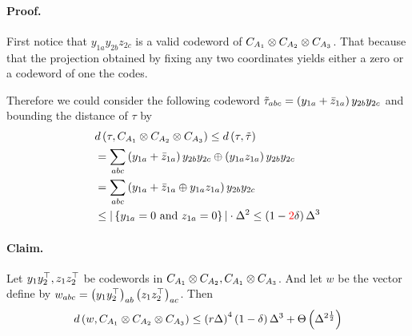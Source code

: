 \documentclass{article}
\begin{document}
\begin{multicols*}{2}
      \paragraph{Proof.} First notice that $y_{1a}y_{2b}z_{2c} $ is a valid codeword of $C_{A_{1}} \otimes C_{A_{2}} \otimes C_{A_{3}}$. That because that the projection obtained by 
      fixing any two coordinates yields either a zero or a codeword of one the codes.
      
      Therefore we could consider the following codeword $ \tilde{\tau}_{abc} = \left( y_{1a} + \bar{z}_{1a} \right)y_{2b}y_{2c} $ and bounding the distance of $\tau$ by 
      \begin{equation*}
	\begin{split}
      & d \left( \tau, C_{A_{1}} \otimes C_{A_{2}} \otimes C_{A_{3}} \right)  \le d \left( \tau, \tilde{\tau} \right) \\ 
      & = \sum_{abc}{   \left( y_{1a} + \bar{z}_{1a} \right)y_{2b}y_{2c} \oplus  \left( y_{1a}z_{1a} \right)y_{2b}y_{2c}  } \\
      & =  \sum_{abc}{   \left( y_{1a} + \bar{z}_{1a} \oplus y_{1a}z_{1a}  \right)y_{2b}y_{2c}  } \\
      & \le | \left\{ y_{1a} = 0 \text{ and }  z_{1a} = 0   \right\} | \cdot \Delta^{2} \le \left( 1-\color{red}2\color{black}\delta \right)\Delta^{3} 
	\end{split}
      \end{equation*}

      \paragraph{Claim.} Let $y_{1}y_{2}^{\top}, z_{1}z_{2}^{\top}$ be codewords in $C_{A_{1}} \otimes C_{A_{2}}, C_{A_{1}} \otimes C_{A_{3}}$. And let $w$ be the vector define by $w_{abc} = \left( y_{1}y_{2}^{\top} \right)_{ab} \left( z_{1}z_{2}^{\top} \right)_{ac} $. Then  
      \begin{equation*}
	d\left(w, C_{A_{1}} \otimes C_{A_{2}} \otimes C_{A_{3}} \right) \le \left( r\Delta \right)^{4}\left( 1 - \delta \right)\Delta^{3} + \Theta \left( \Delta^{2\frac{1}{2}}  \right)
      \end{equation*}


\end{multicols*}
\end{document}
